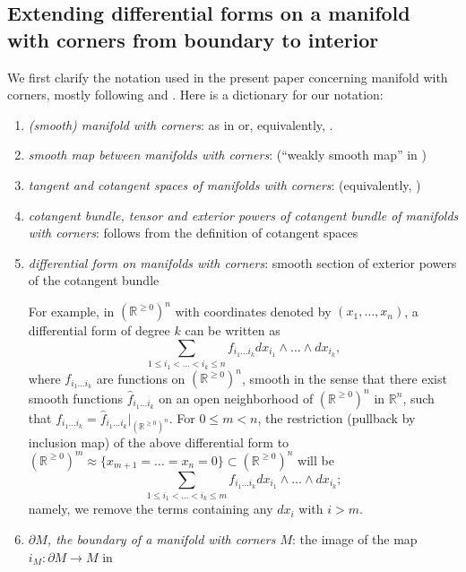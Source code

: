 \documentclass[11pt]{article}
\theoremstyle{definition}
\theoremstyle{remark}
\def\R{\mathbb{R}}
\begin{document}
\begin{appendices}
\section{Extending differential forms on a manifold with corners from boundary to interior}

We first clarify the notation used in the present paper concerning manifold with corners, mostly following \cite{Hajek} and \cite{Joyce}. Here is a dictionary for our notation: 
\begin{enumerate}[label=$\cdot$]
\item {\it (smooth) manifold with corners}: as in \cite[page 3]{Joyce} or, equivalently, \cite[Definition 3]{Hajek}. 
\item {\it smooth map between manifolds with corners}: \cite[Definition 4]{Hajek} (``weakly smooth map'' in \cite[Definition 3.1]{Joyce})

\item {\it tangent and cotangent spaces of manifolds with corners}: \cite[Definition 10]{Hajek} (equivalently, \cite[Definition 2.2]{Joyce})

\item {\it cotangent bundle, tensor and exterior powers of cotangent bundle of manifolds with corners}: follows from the definition of cotangent spaces

\item {\it differential form on manifolds with corners}: smooth section of exterior powers of the cotangent bundle

For example, in $(\R^{\ge0})^n$ with coordinates denoted by $(x_1,\ldots,x_n)$, a differential form of degree $k$ can be written as 
$$\sum_{1\le i_1<\ldots<i_k\le n}f_{i_1\ldots i_k}dx_{i_1}\wedge\ldots\wedge dx_{i_k},$$
where $f_{i_1\ldots i_k}$ are functions on $(\R^{\ge0})^n$, smooth in the sense that there exist smooth functions $\hat{f}_{i_1\ldots i_k}$ on an open neighborhood of $(\R^{\ge0})^n$ in $\R^n$, such that $f_{i_1\ldots i_k}=\hat{f}_{i_1\ldots i_k}|_{(\R^{\ge0})^n}$. 
For $0\le m<n$, the restriction (pullback by inclusion map) of the above differential form to $(\R^{\ge0})^m\approx \{x_{m+1}=\ldots=x_n=0\}\subset(\R^{\ge0})^n$ will be 
$$\sum_{1\le i_1<\ldots<i_k\le m}f_{i_1\ldots i_k}dx_{i_1}\wedge\ldots\wedge dx_{i_k};$$
namely, we remove the terms containing any $dx_i$ with $i>m$. 

\item {\it $\partial M$, the boundary of a manifold with corners $M$}: the image of the map $i_M:\partial M\to M$ in \cite[Definition 2.6]{Joyce}


\end{enumerate}
\end{appendices}
\end{document}

